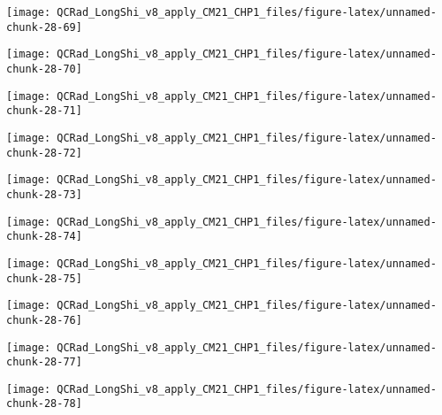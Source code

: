 \documentclass[
  10pt,
  a4paper,oneside]{article}
\begin{document}
\begin{center}\texttt{[image: QCRad\_LongShi\_v8\_apply\_CM21\_CHP1\_files/figure-latex/unnamed-chunk-28-69]} \end{center}

\begin{center}\texttt{[image: QCRad\_LongShi\_v8\_apply\_CM21\_CHP1\_files/figure-latex/unnamed-chunk-28-70]} \end{center}

\begin{center}\texttt{[image: QCRad\_LongShi\_v8\_apply\_CM21\_CHP1\_files/figure-latex/unnamed-chunk-28-71]} \end{center}

\begin{center}\texttt{[image: QCRad\_LongShi\_v8\_apply\_CM21\_CHP1\_files/figure-latex/unnamed-chunk-28-72]} \end{center}

\begin{center}\texttt{[image: QCRad\_LongShi\_v8\_apply\_CM21\_CHP1\_files/figure-latex/unnamed-chunk-28-73]} \end{center}

\begin{center}\texttt{[image: QCRad\_LongShi\_v8\_apply\_CM21\_CHP1\_files/figure-latex/unnamed-chunk-28-74]} \end{center}

\begin{center}\texttt{[image: QCRad\_LongShi\_v8\_apply\_CM21\_CHP1\_files/figure-latex/unnamed-chunk-28-75]} \end{center}

\begin{center}\texttt{[image: QCRad\_LongShi\_v8\_apply\_CM21\_CHP1\_files/figure-latex/unnamed-chunk-28-76]} \end{center}

\begin{center}\texttt{[image: QCRad\_LongShi\_v8\_apply\_CM21\_CHP1\_files/figure-latex/unnamed-chunk-28-77]} \end{center}

\begin{center}\texttt{[image: QCRad\_LongShi\_v8\_apply\_CM21\_CHP1\_files/figure-latex/unnamed-chunk-28-78]} \end{center}
\end{document}
